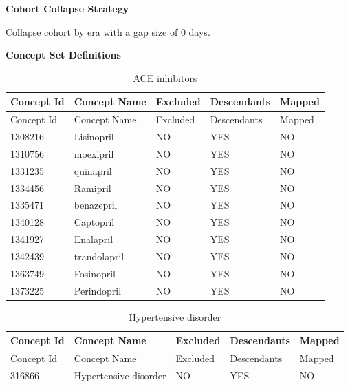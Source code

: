 \documentclass[11pt]{book}
\theoremstyle{definition}
\theoremstyle{definition}
\theoremstyle{definition}
\theoremstyle{remark}
\begin{document}
\textbf{Cohort Collapse Strategy}

Collapse cohort by era with a gap size of 0 days.

\textbf{Concept Set Definitions}

\begin{longtable}[]{@{}lllll@{}}
\caption{\label{tab:aceInhibitorsMono} ACE inhibitors}\tabularnewline
\toprule
Concept Id & Concept Name & Excluded & Descendants & Mapped\tabularnewline
\midrule
\endfirsthead
\toprule
Concept Id & Concept Name & Excluded & Descendants & Mapped\tabularnewline
\midrule
\endhead
1308216 & Lisinopril & NO & YES & NO\tabularnewline
1310756 & moexipril & NO & YES & NO\tabularnewline
1331235 & quinapril & NO & YES & NO\tabularnewline
1334456 & Ramipril & NO & YES & NO\tabularnewline
1335471 & benazepril & NO & YES & NO\tabularnewline
1340128 & Captopril & NO & YES & NO\tabularnewline
1341927 & Enalapril & NO & YES & NO\tabularnewline
1342439 & trandolapril & NO & YES & NO\tabularnewline
1363749 & Fosinopril & NO & YES & NO\tabularnewline
1373225 & Perindopril & NO & YES & NO\tabularnewline
\bottomrule
\end{longtable}

\begin{longtable}[]{@{}lllll@{}}
\caption{\label{tab:hypertensionAceMono} Hypertensive disorder}\tabularnewline
\toprule
Concept Id & Concept Name & Excluded & Descendants & Mapped\tabularnewline
\midrule
\endfirsthead
\toprule
Concept Id & Concept Name & Excluded & Descendants & Mapped\tabularnewline
\midrule
\endhead
316866 & Hypertensive disorder & NO & YES & NO\tabularnewline
\bottomrule
\end{longtable}
\end{document}
